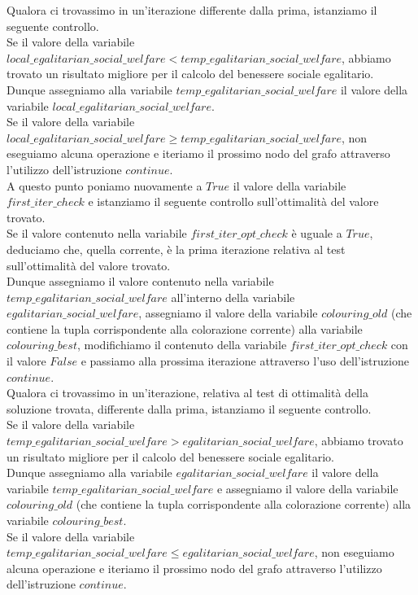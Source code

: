 Qualora ci trovassimo in un'iterazione differente dalla prima, istanziamo il seguente controllo.\\
Se il valore della variabile \\
$local\_egalitarian\_social\_welfare < temp\_egalitarian\_social\_welfare$, abbiamo trovato un risultato migliore per il calcolo del benessere sociale egalitario.\\
Dunque assegniamo alla variabile $temp\_egalitarian\_social\_welfare$ il valore della variabile $local\_egalitarian\_social\_welfare$.\\
Se il valore della variabile \\
$local\_egalitarian\_social\_welfare \geq temp\_egalitarian\_social\_welfare$, non eseguiamo alcuna operazione e iteriamo il prossimo nodo del grafo attraverso l'utilizzo dell'istruzione $continue$.\\

A questo punto poniamo nuovamente a $True$ il valore della variabile $first\_iter\_check$ e istanziamo il seguente controllo sull'ottimalità del valore trovato.\\

Se il valore contenuto nella variabile $first\_iter\_opt\_check$ è uguale a $True$, deduciamo che, quella corrente, è la prima iterazione relativa al test sull'ottimalità del valore trovato.\\
Dunque assegniamo il valore contenuto nella variabile \\
$temp\_egalitarian\_social\_welfare$ all'interno della variabile \\
$egalitarian\_social\_welfare$, assegniamo il valore della variabile $colouring\_old$ (che contiene la tupla corrispondente alla colorazione corrente) alla variabile $colouring\_best$, modifichiamo il contenuto della variabile $first\_iter\_opt\_check$ con il valore $False$ e passiamo alla prossima iterazione attraverso l'uso dell'istruzione $continue$.\\

Qualora ci trovassimo in un'iterazione, relativa al test di ottimalità della soluzione trovata, differente dalla prima, istanziamo il seguente controllo.\\
Se il valore della variabile \\
$temp\_egalitarian\_social\_welfare > egalitarian\_social\_welfare$, abbiamo trovato un risultato migliore per il calcolo del benessere sociale egalitario.\\
Dunque assegniamo alla variabile $egalitarian\_social\_welfare$ il valore della variabile $temp\_egalitarian\_social\_welfare$ e assegniamo il valore della variabile $colouring\_old$ (che contiene la tupla corrispondente alla colorazione corrente) alla variabile $colouring\_best$.\\
Se il valore della variabile \\
$temp\_egalitarian\_social\_welfare \leq egalitarian\_social\_welfare$, non eseguiamo alcuna operazione e iteriamo il prossimo nodo del grafo attraverso l'utilizzo dell'istruzione $continue$.\\

